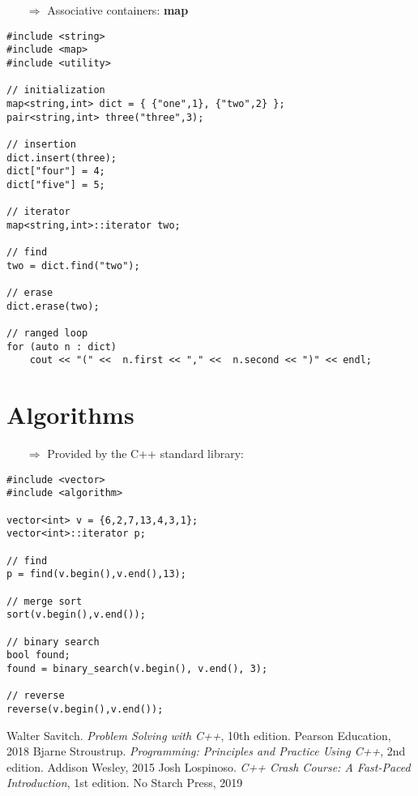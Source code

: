 \documentclass[10pt]{article}
\begin{document}
\begin{enumerate}
\item[$\Rightarrow$] Associative containers: \textbf{map}
\end{enumerate}
\begin{lstlisting}
#include <string>
#include <map>
#include <utility>

// initialization
map<string,int> dict = { {"one",1}, {"two",2} };
pair<string,int> three("three",3);

// insertion    
dict.insert(three);
dict["four"] = 4;
dict["five"] = 5;

// iterator    
map<string,int>::iterator two;

// find    
two = dict.find("two");

// erase    
dict.erase(two);

// ranged loop
for (auto n : dict)
    cout << "(" <<  n.first << "," <<  n.second << ")" << endl;
\end{lstlisting}
%
%
\section{Algorithms}
\small
\begin{enumerate}
\item[$\Rightarrow$] Provided by the C++ standard library:
\end{enumerate}
\begin{lstlisting}
#include <vector>
#include <algorithm>

vector<int> v = {6,2,7,13,4,3,1};
vector<int>::iterator p;

// find
p = find(v.begin(),v.end(),13);

// merge sort
sort(v.begin(),v.end());

// binary search
bool found;
found = binary_search(v.begin(), v.end(), 3);

// reverse
reverse(v.begin(),v.end());
\end{lstlisting}
%
%
\small
\begin{thebibliography}{99}
 Walter Savitch. \textsl{Problem Solving with C++}, 10th edition. Pearson Education, 2018
 Bjarne Stroustrup. \textsl{Programming: Principles and Practice Using C++}, 2nd edition. Addison Wesley, 2015
 Josh Lospinoso. \textsl{C++ Crash Course: A Fast-Paced Introduction}, 1st edition. No Starch Press, 2019
\end{thebibliography}
\end{document}

